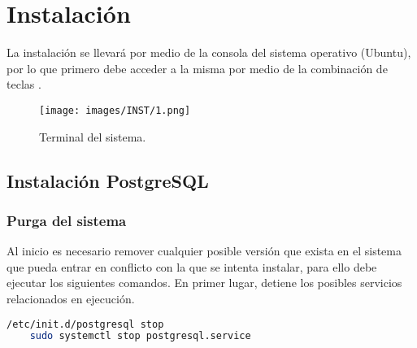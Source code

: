 

\lstset{style=mystyle}

\chapter{Instalación}

La instalación se llevará por medio de la consola del sistema operativo (Ubuntu), por lo que primero debe acceder a la misma por medio de la combinación de teclas .

\begin{figure}[htbp!]
	\begin{center}
		\texttt{[image: images/INST/1.png]}
		\caption{Terminal del sistema.}
	\end{center}
\end{figure}

\section{Instalación PostgreSQL}

\subsection{Purga del sistema}

Al inicio es necesario remover cualquier posible versi\'on que exista en el sistema que pueda entrar en conflicto con la que se intenta instalar, para ello debe ejecutar los siguientes comandos.
\bigbreak
En primer lugar, detiene los posibles servicios relacionados en ejecuci\'on.

\begin{lstlisting}[language=bash]
    /etc/init.d/postgresql stop
    sudo systemctl stop postgresql.service
\end{lstlisting}

